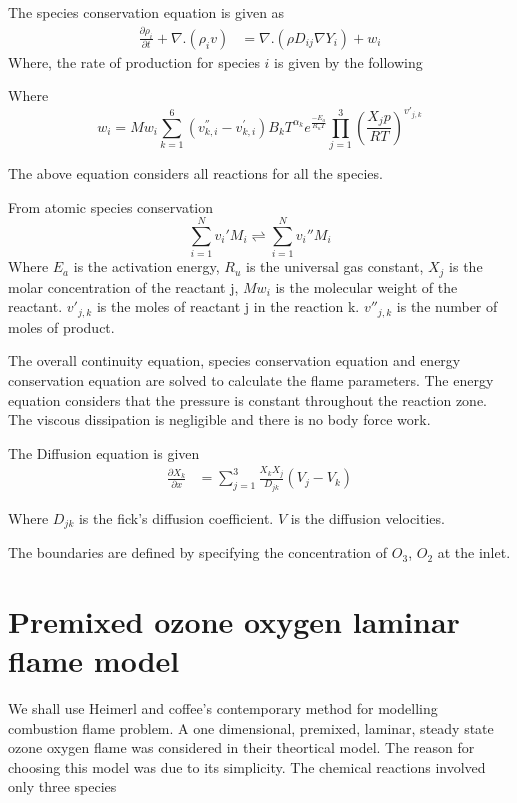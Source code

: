 \noindent The species conservation equation is given as 
\begin{eqnarray}
	\frac{\partial \rho_i}{\partial t} + \nabla . (\rho_i v) &= \nabla . (\rho D_{ij} \nabla Y_i) + w_i
\end{eqnarray}
\noindent Where, the rate of production for species $i$ is given by the following 
	
Where $$w_i = Mw_i \sum_{k=1}^{6}(v_{k,i}^{''} - v_{k,i}^{'}) B_k T^{\alpha_k} e^{\frac{-E_a}{R_u T}} \prod_{j=1}^3 \left(\frac{X_j p}{R T} \right)^{v'_{j,k}}$$

\noindent The above equation considers all reactions for all the species. 

\noindent From atomic species conservation 
	$$\sum_{i=1}^{N} v_i{'}M_i \rightleftharpoons \sum_{i=1}^{N} v_i{''}M_i $$
\noindent Where $E_a$ is the activation energy, $R_u$ is the universal gas constant, $X_j$ is the molar concentration of the reactant j, $Mw_i$ is the molecular weight of the reactant. $v'_{j,k}$ is the moles of reactant j in the reaction k. $v''_{j,k}$ is the number of moles of product. 

\bigskip

\noindent The overall continuity equation, species conservation equation and energy conservation equation are solved to calculate the flame parameters. The energy equation considers that the pressure is constant throughout the reaction zone. The viscous dissipation is negligible and there is no body force work. 

\noindent The Diffusion equation is given 
\begin{eqnarray}
\frac{\partial X_k}{\partial x} &= \sum_{j=1}^{3} \frac{X_k X_j}{D_{jk}} (V_j - V_k)
\end{eqnarray}

\noindent Where $D_{jk}$ is the fick's diffusion coefficient. $V$ is the diffusion velocities. 

\noindent The boundaries are defined by specifying the concentration of $O_3$, $O_2$ at the inlet. 

\section{Premixed ozone oxygen laminar flame model}
We shall use Heimerl and coffee's contemporary method for modelling combustion flame problem. A one dimensional, premixed, laminar, steady state ozone oxygen flame was considered in their theortical model. The reason for choosing this model was due to its simplicity. The chemical reactions involved only three species 


